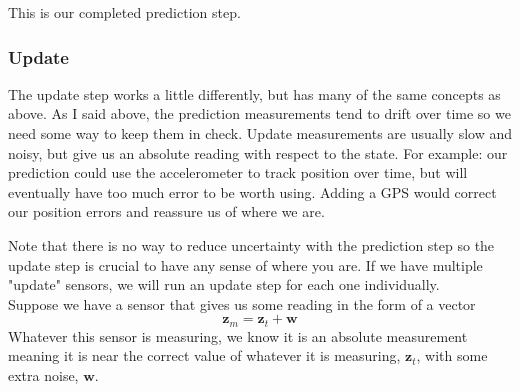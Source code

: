 \documentclass[11pt]{article}
\renewcommand{\vec}[1]{\mathbf{#1}}
\begin{document}
This is our completed prediction step.
\subsubsection{Update}
The update step works a little differently, but has many of the same concepts as above. As I said above, the prediction measurements tend to drift over time so we need some way to keep them in check. Update measurements are usually slow and noisy, but give us an absolute reading with respect to the state. For example: our prediction could use the accelerometer to track position over time, but will eventually have too much error to be worth using. Adding a GPS would correct our position errors and reassure us of where we are. 

Note that there is no way to reduce uncertainty with the prediction step so the update step is crucial to have any sense of where you are. If we have multiple "update" sensors, we will  run an update step for each one individually.\\

Suppose we have a sensor that gives us some reading in the form of a vector 
$$\vec{z}_m = \vec{z}_t + \vec{w}$$
Whatever this sensor is measuring, we know it is an absolute measurement meaning it is near the correct value of whatever it is measuring, $\vec{z}_t$, with some extra noise, $\vec{w}$.
\end{document}
